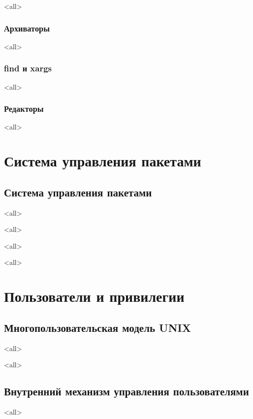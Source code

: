 \mode<all>{}

\subsection{Архиваторы}
\mode<all>{}

\subsection{find и xargs}
\mode<all>{}

\subsection{Редакторы}
\mode<all>{}

\chapter{Система управления пакетами}
\section{Система управления пакетами}
\mode<all>{}

\mode<all>{}

\mode<all>{}

\mode<all>{}

\chapter{Пользователи и привилегии}

\section{Многопользовательская модель UNIX}
\mode<all>{}

\mode<all>{}
\section{Внутренний механизм управления пользователями}
\mode<all>{}

